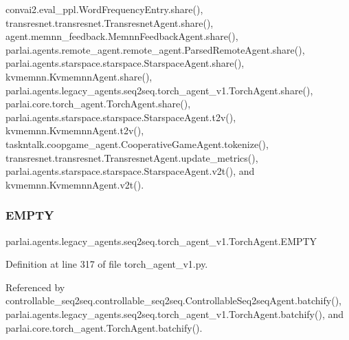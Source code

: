 convai2.\+eval\+\_\+ppl.\+Word\+Frequency\+Entry.\+share(), transresnet.\+transresnet.\+Transresnet\+Agent.\+share(), agent.\+memnn\+\_\+feedback.\+Memnn\+Feedback\+Agent.\+share(), parlai.\+agents.\+remote\+\_\+agent.\+remote\+\_\+agent.\+Parsed\+Remote\+Agent.\+share(), parlai.\+agents.\+starspace.\+starspace.\+Starspace\+Agent.\+share(), kvmemnn.\+Kvmemnn\+Agent.\+share(), parlai.\+agents.\+legacy\+\_\+agents.\+seq2seq.\+torch\+\_\+agent\+\_\+v1.\+Torch\+Agent.\+share(), parlai.\+core.\+torch\+\_\+agent.\+Torch\+Agent.\+share(), parlai.\+agents.\+starspace.\+starspace.\+Starspace\+Agent.\+t2v(), kvmemnn.\+Kvmemnn\+Agent.\+t2v(), taskntalk.\+coopgame\+\_\+agent.\+Cooperative\+Game\+Agent.\+tokenize(), transresnet.\+transresnet.\+Transresnet\+Agent.\+update\+\_\+metrics(), parlai.\+agents.\+starspace.\+starspace.\+Starspace\+Agent.\+v2t(), and kvmemnn.\+Kvmemnn\+Agent.\+v2t().

\mbox{\label{classparlai_1_1agents_1_1legacy__agents_1_1seq2seq_1_1torch__agent__v1_1_1TorchAgent_aaed187f97f489122996e967206a01927}} 
\subsubsection{\texorpdfstring{E\+M\+P\+TY}{EMPTY}}
{\footnotesize\ttfamily parlai.\+agents.\+legacy\+\_\+agents.\+seq2seq.\+torch\+\_\+agent\+\_\+v1.\+Torch\+Agent.\+E\+M\+P\+TY}



Definition at line 317 of file torch\+\_\+agent\+\_\+v1.\+py.



Referenced by controllable\+\_\+seq2seq.\+controllable\+\_\+seq2seq.\+Controllable\+Seq2seq\+Agent.\+batchify(), parlai.\+agents.\+legacy\+\_\+agents.\+seq2seq.\+torch\+\_\+agent\+\_\+v1.\+Torch\+Agent.\+batchify(), and parlai.\+core.\+torch\+\_\+agent.\+Torch\+Agent.\+batchify().

\mbox{\label{classparlai_1_1agents_1_1legacy__agents_1_1seq2seq_1_1torch__agent__v1_1_1TorchAgent_aa78932aa1b5886cd03f1592bfa6ed4f5}} 
